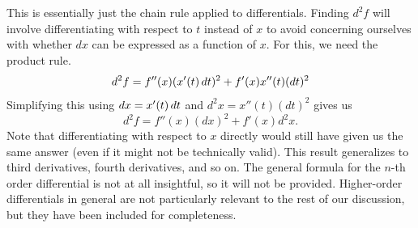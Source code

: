 \documentclass[a4paper,12pt]{article}
\begin{document}
This is essentially just the chain rule applied to differentials.
Finding $d^2 f$ will involve differentiating with respect to $t$ instead of $x$ to avoid concerning ourselves with whether $dx$ can be expressed as a function of $x$.
For this, we need the product rule.
\begin{equation*}
    d^2 f = f''(x) (x'(t)\mathop{}\!d t)^2 + f'(x) x''(t) (dt)^2
\end{equation*}
Simplifying this using $dx = x'(t)\mathop{}\!d t$ and $d^2 x = x''(t) (dt)^2$ gives us
\begin{equation*}
    d^2 f = f''(x) (dx)^2 + f'(x) d^2 x.
\end{equation*}
Note that differentiating with respect to $x$ directly would still have given us the same answer (even if it might not be technically valid).
This result generalizes to third derivatives, fourth derivatives, and so on.
The general formula for the $n$-th order differential is not at all insightful, so it will not be provided.
Higher-order differentials in general are not particularly relevant to the rest of our discussion, but they have been included for completeness.
\end{document}
